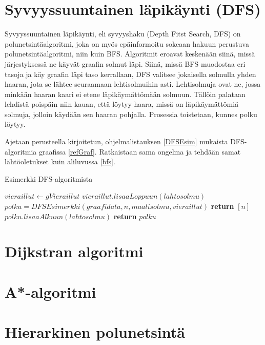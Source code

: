 \section{Syvyyssuuntainen läpikäynti (DFS)}\label{dfs}
Syvyyssuuntainen läpikäynti, eli syvyyshaku (Depth Fitst Search, DFS) on 
polunetsintäalgoritmi, joka on myös epäinformoitu sokeaan hakuun perustuva 
polunetsintäalgoritmi, niin kuin BFS.\cite{applSciLawande} Algoritmit eroavat 
keskenään siinä, missä järjestyksessä ne käyvät graafin solmut läpi. Siinä, 
missä BFS muodostaa eri tasoja ja käy graafin läpi taso kerrallaan, DFS 
valitsee jokaisella solmulla yhden haaran, jota se lähtee seuraamaan 
lehtisolmuihin asti.\cite{DFSMapColoring} Lehtisolmuja ovat ne, jossa minkään 
haaran kaari ei etene läpikäymättömään solmuun.\cite{DFSMapColoring} Tällöin 
palataan lehdistä poispäin niin kauan, että löytyy haara, missä on 
läpikäymättömiä solmuja, jolloin käydään sen haaran pohjalla. Prosessia 
toistetaan, kunnes polku löytyy. \par
	Ajetaan \textcite{DFSMapColoring} perusteella kirjoitetun, 
ohjelmalistauksen \ref{DFSEsim} mukaista DFS-algoritmia graafissa 
\ref{refGraf}. Ratkaistaan sama ongelma ja tehdään samat lähtöoletukset kuin 
aliluvussa \ref{bfs}.

\begin{algorithm}
\caption{Esimerkki DFS-algoritmista}\label{DFSEsim}
\begin{algorithmic}
	\State $vieraillut \gets gVieraillut$
	\State $vieraillut.lisaaLoppuun(lahtosolmu)$
				\State $polku = DFSEsimerkki(graafidata,n,maalisolmu,vieraillut)$
			\Else
				\State \textbf{return} $[n]$
			\EndIf
		\EndIf
	\EndFor
		\State $polku.lisaaAlkuun(lahtosolmu)$
	\EndIf
	\State \textbf{return} $polku$
\EndProcedure
\end{algorithmic}
\end{algorithm}

\section{Dijkstran algoritmi}\label{dijkstra}
\section{A*-algoritmi}\label{aStar}
\section{Hierarkinen polunetsintä}\label{hpa}
